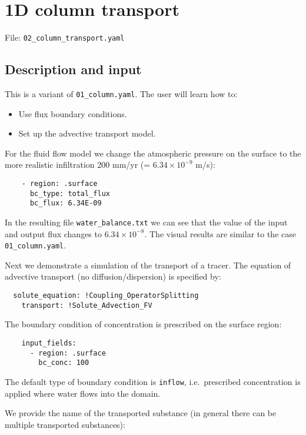\section{1D column transport}

File: \texttt{02\_column\_transport.yaml}

\subsection{Description and input}

This is a variant of \texttt{01\_column.yaml}. The user will learn how
to:

\begin{itemize}
\tightlist
\item
  Use flux boundary conditions.
\item
  Set up the advective transport model.
\end{itemize}

For the fluid flow model we change the atmospheric pressure on the
surface to the more realistic infiltration 200 mm/yr (=
\(6.34\times 10^{-9}\) m/s):

\begin{verbatim}
    - region: .surface
      bc_type: total_flux
      bc_flux: 6.34E-09
\end{verbatim}

In the resulting file \texttt{water\_balance.txt} we can see that the
value of the input and output flux changes to \(6.34 \times 10^{-8}\).
The visual results are similar to the case \texttt{01\_column.yaml}.

Next we demonstrate a simulation of the transport of a tracer. The
equation of advective transport (no diffusion/dispersion) is specified
by:

\begin{verbatim}
  solute_equation: !Coupling_OperatorSplitting
    transport: !Solute_Advection_FV
\end{verbatim}

The boundary condition of concentration is prescribed on the surface
region:

\begin{verbatim}
    input_fields:
      - region: .surface
        bc_conc: 100
\end{verbatim}

The default type of boundary condition is \texttt{inflow},
i.e.~prescribed concentration is applied where water flows into the
domain.

We provide the name of the transported substance (in general there can
be multiple transported substances):

